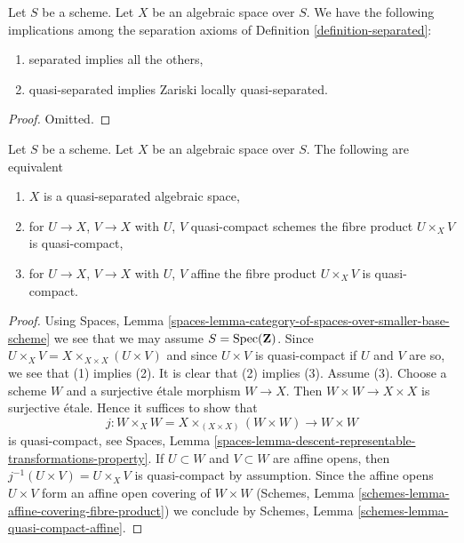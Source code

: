 \begin{lemma}
\label{lemma-trivial-implications}
Let $S$ be a scheme.
Let $X$ be an algebraic space over $S$.
We have the following implications among the separation axioms
of Definition \ref{definition-separated}:
\begin{enumerate}
\item separated implies all the others,
\item quasi-separated implies Zariski locally quasi-separated.
\end{enumerate}
\end{lemma}

\begin{proof}
Omitted.
\end{proof}

\begin{lemma}
\label{lemma-characterize-quasi-separated}
Let $S$ be a scheme. Let $X$ be an algebraic space over $S$.
The following are equivalent
\begin{enumerate}
\item $X$ is a quasi-separated algebraic space,
\item for $U \to X$, $V \to X$ with $U$, $V$ quasi-compact schemes
the fibre product $U \times_X V$ is quasi-compact,
\item for $U \to X$, $V \to X$ with $U$, $V$ affine
the fibre product $U \times_X V$ is quasi-compact.
\end{enumerate}
\end{lemma}

\begin{proof}
Using Spaces, Lemma
\ref{spaces-lemma-category-of-spaces-over-smaller-base-scheme}
we see that we may assume $S = \mathop{\mathrm{Spec}}(\mathbf{Z})$.
Since $U \times_X V = X \times_{X \times X} (U \times V)$
and since $U \times V$ is quasi-compact if $U$ and $V$ are so,
we see that (1) implies (2). It is clear that (2) implies (3).
Assume (3). Choose a scheme $W$ and a surjective \'etale morphism
$W \to X$. Then $W \times W \to X \times X$ is surjective \'etale.
Hence it suffices to show that
$$
j : W \times_X W = X \times_{(X \times X)} (W \times W) \to W \times W
$$
is quasi-compact, see Spaces, Lemma
\ref{spaces-lemma-descent-representable-transformations-property}.
If $U \subset W$ and $V \subset W$ are affine opens, then
$j^{-1}(U \times V) = U \times_X V$ is quasi-compact by assumption.
Since the affine opens $U \times V$ form an affine open covering of
$W \times W$ (Schemes, Lemma \ref{schemes-lemma-affine-covering-fibre-product})
we conclude by
Schemes, Lemma \ref{schemes-lemma-quasi-compact-affine}.
\end{proof}

